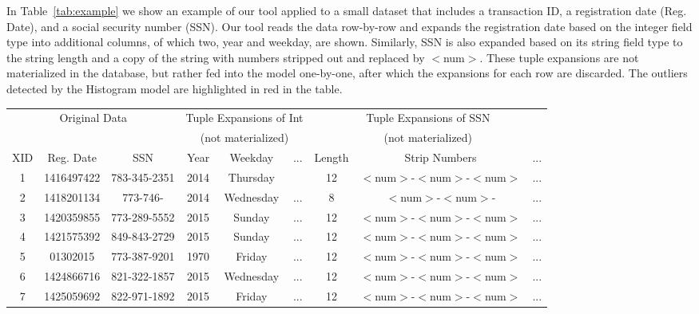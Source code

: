 In Table~\ref{tab:example} we show an example of our tool applied to a small dataset that includes a transaction ID, a registration date (Reg. Date), and a social security number (SSN).
Our tool reads the data row-by-row and expands the registration date based on the integer field type into additional columns, of which two, year and weekday, are shown.
Similarly, SSN is also expanded based on its string field type to the string length and a copy of the string with numbers stripped out and replaced by $<$num$>$.
These tuple expansions are not materialized in the database, but rather fed into the model one-by-one, after which the expansions for each row are discarded.
The outliers detected by the Histogram model are highlighted in red in the table. 

\begin{table*}[t]
\begin{center}
\begin{tabular}{|c|c|c||c|c|c||c|c|c|}
\multicolumn{3}{c}{Original Data} & \multicolumn{3}{c}{Tuple Expansions of Int} & \multicolumn{3}{c}{Tuple Expansions of SSN} \\
\multicolumn{3}{c}{} & \multicolumn{3}{c}{(not materialized)} & \multicolumn{3}{c}{(not materialized)} \\
\hline
XID & Reg. Date & SSN & Year & Weekday & ... & Length & Strip Numbers & ... \\ \hline
1 & 1416497422 & 783-345-2351 & 2014 & Thursday && 12 & $<$num$>$-$<$num$>$-$<$num$>$ &...  \\ \hline 
\rowcolor{red} 
2 & 1418201134 & 773-746- & 2014  & Wednesday &...& 8 & $<$num$>$-$<$num$>$- &...  \\ \hline 
3 & 1420359855 & 773-289-5552 & 2015  & Sunday &...& 12 & $<$num$>$-$<$num$>$-$<$num$>$ &...  \\ \hline 
4 & 1421575392 & 849-843-2729 & 2015 & Sunday &...& 12 & $<$num$>$-$<$num$>$-$<$num$>$ &  ...\\ \hline 
\rowcolor{red} 
5 & 01302015 & 773-387-9201 & 1970 & Friday &...& 12 & $<$num$>$-$<$num$>$-$<$num$>$ &  ...\\ \hline 
6 & 1424866716 & 821-322-1857 & 2015 & Wednesday &...& 12 & $<$num$>$-$<$num$>$-$<$num$>$ &  ...\\ \hline 
7 & 1425059692 & 822-971-1892 & 2015 & Friday &...& 12 & $<$num$>$-$<$num$>$-$<$num$>$ &  ...\\ \hline 

\end{tabular}
\end{center}
\end{table*}
